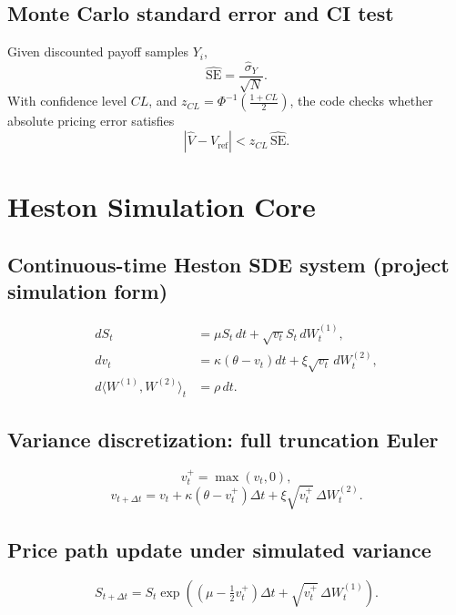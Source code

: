 \documentclass[11pt]{article}
\begin{document}
\subsection{Monte Carlo standard error and CI test}
Given discounted payoff samples $Y_i$,
\begin{equation}
\widehat{\mathrm{SE}} = \frac{\widehat{\sigma}_Y}{\sqrt{N}}.
\end{equation}
With confidence level $CL$, and $z_{CL}=\Phi^{-1}(\frac{1+CL}{2})$, the code checks whether absolute pricing error satisfies
\begin{equation}
|\widehat{V}-V_{\text{ref}}| < z_{CL}\,\widehat{\mathrm{SE}}.
\end{equation}

\section{Heston Simulation Core}

\subsection{Continuous-time Heston SDE system (project simulation form)}
\begin{align}
 dS_t &= \mu S_t\,dt + \sqrt{v_t}S_t\,dW_t^{(1)},\\
 dv_t &= \kappa(\theta-v_t)dt + \xi\sqrt{v_t}\,dW_t^{(2)},\\
 d\langle W^{(1)},W^{(2)}\rangle_t &= \rho\,dt.
\end{align}

\subsection{Variance discretization: full truncation Euler}
\begin{equation}
 v_t^+ = \max(v_t,0),
\end{equation}
\begin{equation}
 v_{t+\Delta t} = v_t + \kappa(\theta-v_t^+)\Delta t + \xi\sqrt{v_t^+}\,\Delta W_t^{(2)}.
\end{equation}

\subsection{Price path update under simulated variance}
\begin{equation}
S_{t+\Delta t} = S_t\exp\!\left((\mu-\tfrac12 v_t^+)\Delta t + \sqrt{v_t^+}\,\Delta W_t^{(1)}\right).
\end{equation}
\end{document}
